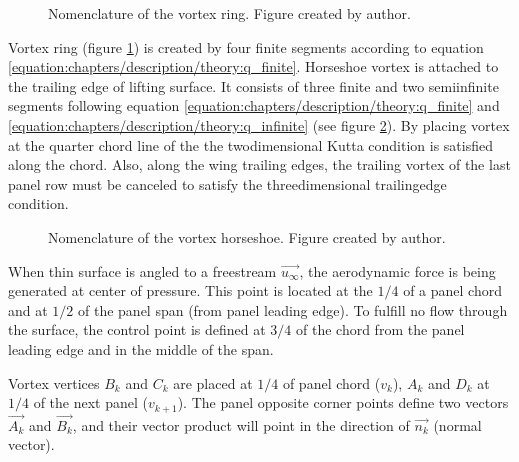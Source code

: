 \documentclass[letterpaper,10pt,english]{jupyterBook}
\let\sphinxpxdimen\pdfpxdimen\else\newdimen\sphinxpxdimen
\begin{document}
\begin{figure}[htbp]
\centering
\capstart

\noindent\sphinxincludegraphics[height=400\sphinxpxdimen]{{ring}.png}
\caption{Nomenclature of the vortex ring. Figure created by author.}\label{\detokenize{chapters/description/theory:ring}}\end{figure}

\sphinxAtStartPar
Vortex ring (figure \hyperref[\detokenize{chapters/description/theory:ring}]{\ref{\detokenize{chapters/description/theory:ring}}}) is created by four finite segments according to equation \eqref{equation:chapters/description/theory:q_finite}. Horseshoe vortex is attached to the trailing edge of lifting surface. It consists of three finite and two semi\sphinxhyphen{}infinite segments following equation \eqref{equation:chapters/description/theory:q_finite} and \eqref{equation:chapters/description/theory:q_infinite} (see figure \hyperref[\detokenize{chapters/description/theory:horseshoe}]{\ref{\detokenize{chapters/description/theory:horseshoe}}}). By placing vortex at the quarter chord line of the the two\sphinxhyphen{}dimensional Kutta condition is satisfied along the chord.  Also, along the
wing trailing edges, the trailing vortex of the last panel row must be canceled to satisfy the three\sphinxhyphen{}dimensional trailing\sphinxhyphen{}edge condition.

\begin{figure}[htbp]
\centering
\capstart

\noindent\sphinxincludegraphics[height=400\sphinxpxdimen]{{horseshoe}.png}
\caption{Nomenclature of the vortex horseshoe. Figure created by author.}\label{\detokenize{chapters/description/theory:horseshoe}}\end{figure}

\sphinxAtStartPar
When thin surface is angled to a free\sphinxhyphen{}stream \(\overrightarrow{u_{\infty}}\), the aerodynamic force is being generated at center of pressure. This point is located at the \(1/4\) of a panel chord and at \(1/2\) of the panel span (from panel leading edge). To fulfill no flow through the surface, the control point is defined at \(3/4\) of the chord from the panel leading edge and in the middle of the span.

\sphinxAtStartPar
Vortex vertices \(B_k\) and \(C_k\) are placed at \(1/4\) of panel chord (\(v_{k}\)), \(A_k\) and \(D_k\) at \(1/4\) of the next panel (\(v_{k+1}\)). The panel opposite corner points define two vectors \(\overrightarrow{A_k}\) and \(\overrightarrow{B_k}\), and their vector product will point in the direction of \(\overrightarrow{n_k}\) (normal vector).
\end{document}
